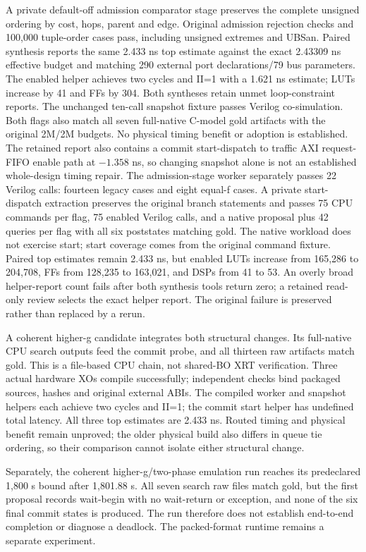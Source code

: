 \documentclass[10pt]{article}
\begin{document}
A private default-off admission comparator stage preserves the complete
unsigned ordering by cost, hops, parent and edge. Original admission rejection
checks and 100,000 tuple-order cases pass, including unsigned extremes
and UBSan. Paired synthesis reports the same 2.433 ns top estimate
against the exact 2.43309 ns effective budget and matching 290 external
port declarations/79 bus parameters. The enabled helper achieves two
cycles and II=1 with a 1.621 ns estimate; LUTs increase by 41 and FFs by
304. Both syntheses retain unmet loop-constraint reports. The unchanged
ten-call snapshot fixture passes Verilog co-simulation. Both flags also
match all seven full-native C-model gold artifacts with the original
2M/2M budgets. No physical timing benefit or adoption is established.
The retained report also contains a commit start-dispatch to traffic AXI
request-FIFO enable path at $-1.358$ ns, so changing snapshot alone is
not an established whole-design timing repair.
The admission-stage worker separately passes 22 Verilog calls: fourteen
legacy cases and eight equal-f cases. A private start-dispatch extraction
preserves the original branch statements and passes 75 CPU commands per
flag, 75 enabled Verilog calls, and a native proposal plus 42 queries per
flag with all six poststates matching gold. The native workload does not
exercise start; start coverage comes from the original command fixture.
Paired top estimates remain 2.433 ns, but enabled LUTs increase from
165,286 to 204,708, FFs from 128,235 to 163,021, and DSPs from 41 to 53.
An overly broad helper-report count fails after both synthesis tools
return zero; a retained read-only review selects the exact helper report.
The original failure is preserved rather than replaced by a rerun.

A coherent higher-g candidate integrates both structural changes. Its
full-native CPU search outputs feed the commit probe, and all thirteen
raw artifacts match gold. This is a file-based CPU chain, not shared-BO
XRT verification. Three actual hardware XOs compile successfully;
independent checks bind packaged sources, hashes and original external
ABIs. The compiled worker and snapshot helpers each achieve two cycles
and II=1; the commit start helper has undefined total latency. All three
top estimates are 2.433 ns. Routed timing and physical benefit remain
unproved; the older physical build also differs in queue tie ordering,
so their comparison cannot isolate either structural change.

Separately, the coherent higher-g/two-phase emulation run reaches its
predeclared 1,800 s bound after 1,801.88 s. All seven search raw files
match gold, but the first proposal records wait-begin with no wait-return
or exception, and none of the six final commit states is produced.
The run therefore does not establish end-to-end completion or diagnose
a deadlock. The packed-format runtime remains a separate experiment.
\end{document}

